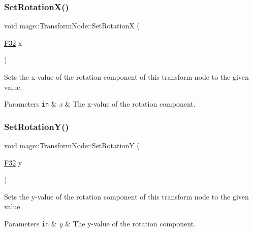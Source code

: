 \subsubsection{\texorpdfstring{Set\+Rotation\+X()}{SetRotationX()}}
{\footnotesize\ttfamily void mage\+::\+Transform\+Node\+::\+Set\+RotationX (\begin{DoxyParamCaption}\item[{\hyperlink{namespacemage_aa97e833b45f06d60a0a9c4fc22ae02c0}{F32}}]{x }\end{DoxyParamCaption})\hspace{0.3cm}{\ttfamily [noexcept]}}

Sets the x-\/value of the rotation component of this transform node to the given value.


\begin{DoxyParams}[1]{Parameters}
\mbox{\tt in}  & {\em x} & The x-\/value of the rotation component. \\
\hline
\end{DoxyParams}
\hypertarget{structmage_1_1_transform_node_a131c7b47c7ee2268c49a7fbad26c2405}{}\label{structmage_1_1_transform_node_a131c7b47c7ee2268c49a7fbad26c2405} 
\subsubsection{\texorpdfstring{Set\+Rotation\+Y()}{SetRotationY()}}
{\footnotesize\ttfamily void mage\+::\+Transform\+Node\+::\+Set\+RotationY (\begin{DoxyParamCaption}\item[{\hyperlink{namespacemage_aa97e833b45f06d60a0a9c4fc22ae02c0}{F32}}]{y }\end{DoxyParamCaption})\hspace{0.3cm}{\ttfamily [noexcept]}}

Sets the y-\/value of the rotation component of this transform node to the given value.


\begin{DoxyParams}[1]{Parameters}
\mbox{\tt in}  & {\em y} & The y-\/value of the rotation component. \\
\hline
\end{DoxyParams}
\hypertarget{structmage_1_1_transform_node_aaa6413a6afa54e1935efd8137ebe4d42}{}\label{structmage_1_1_transform_node_aaa6413a6afa54e1935efd8137ebe4d42} 
